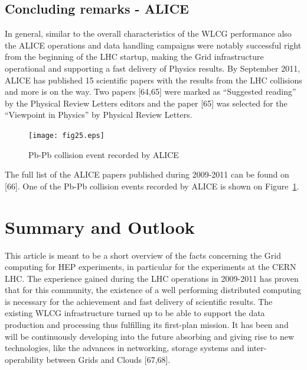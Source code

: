 \documentclass{intech}
\begin{document}
\subsection{Concluding remarks - ALICE}
%
In general, similar to the overall characteristics of the WLCG
performance also the ALICE operations and data handling campaigns
were notably successful right from the beginning of the LHC startup,
making the Grid infrastructure operational and supporting a fast
delivery of Physics results. By September 2011, ALICE has published
15 scientific papers with the results from the LHC collisions and
more is on the way. Two papers [64,65] were marked as ``Suggested
reading'' by the Physical Review Letters editors and the paper [65]
was selected for the ``Viewpoint in Physics'' by Physical Review
Letters.


\begin{figure}[htb] %
\centering
\texttt{[image: fig25.eps]} %
\caption{Pb-Pb collision event recorded by ALICE}\label{fig25}
\end{figure}



The full list of the ALICE papers published during 2009-2011 can be
found on [66]. One of the Pb-Pb collision events recorded by ALICE is
shown on Figure~\ref{fig25}.



\newpage

\section{Summary and Outlook}

This article is meant to be a short overview of the facts concerning
the Grid computing for HEP experiments, in particular for the
experiments at the CERN LHC. The experience gained during the LHC
operations in 2009-2011 has proven that for this community, the
existence of a well performing distributed computing
is necessary for the achievement and fast delivery of scientific
results. The existing WLCG infrastructure turned up to be able to
support the data production and processing thus fulfilling its
first-plan mission. It has been and will be continuously developing
into the future absorbing and giving rise to new technologies, like
the advances in networking, storage systems and inter-operability
between Grids and Clouds [67,68].
\end{document}
